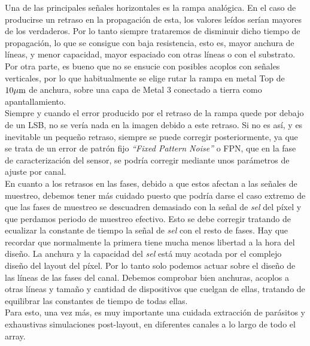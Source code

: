 Una de las principales señales horizontales es la rampa analógica. En el caso de
producirse un retraso en la propagación de esta, los valores leídos serían mayores
de los verdaderos. Por lo tanto siempre trataremos de disminuir dicho tiempo de
propagación, lo que se consigue con baja resistencia, esto es, mayor anchura de
líneas, y menor capacidad, mayor espaciado con otras líneas o con el substrato.
Por otra parte, es bueno que no se ensucie con posibles acoplos con señales verticales,
por lo que habitualmente se elige rutar la rampa en metal Top de $10\mu\text{m}$ de anchura,
sobre una capa de Metal 3 conectado a tierra como apantallamiento.\\

Siempre y cuando el error producido por el retraso de la rampa quede por debajo
de un LSB, no se vería nada en la imagen debido a este retraso. Si no es así, y es
inevitable un pequeño retraso, siempre se puede corregir posteriormente, ya que
se trata de un error de patrón fijo \textit{``Fixed Pattern Noise''} o FPN, que
en la fase de caracterización del sensor, se podría corregir mediante unos
parámetros de ajuste por canal.\\

En cuanto a los retrasos en las fases, debido a que estos afectan a las señales de
muestreo, debemos tener más cuidado puesto que podría darse el caso extremo de
que las fases de muestreo se descuadren demasiado con la señal de \textit{sel} del
píxel y que perdamos periodo de muestreo efectivo. Esto se debe corregir tratando
de ecualizar la constante de tiempo la señal de \textit{sel} con el resto de
fases. Hay que recordar que normalmente la primera tiene mucha menos libertad a la
hora del diseño. La anchura y la capacidad del \textit{sel} está muy acotada
por el complejo diseño del layout del píxel. Por lo tanto solo podemos actuar
sobre el diseño de las líneas de las fases del canal. Debemos comprobar bien
anchuras, acoplos a otras líneas y tamaño y cantidad de dispositivos que cuelgan
de ellas, tratando de equilibrar las constantes de tiempo de todas ellas.\\

Para esto, una vez más, es muy importante una cuidada extracción de parásitos y
exhaustivas simulaciones post-layout, en diferentes canales a lo largo de todo el
array.\\

